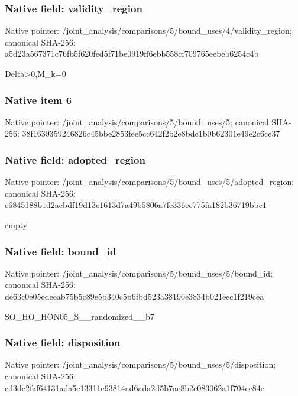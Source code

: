 \documentclass[10pt,a4paper]{article}
\begin{document}
\subsubsection{Native field: validity\_\allowbreak{}region}
Native pointer: /joint\_\allowbreak{}analysis/comparisons/5/bound\_\allowbreak{}uses/4/validity\_\allowbreak{}region; canonical SHA-256: a5d23a567371c76fb5f620fed5f71be0919ff6ebb558cf709765eebeb6254c4b

\begingroup\raggedright\sloppy Delta>0,\allowbreak{}M\_\allowbreak{}k=\allowbreak{}0\par\endgroup

\subsubsection{Native item 6}
Native pointer: /joint\_\allowbreak{}analysis/comparisons/5/bound\_\allowbreak{}uses/5; canonical SHA-256: 38f1630359246826c45bbe2853fee5cc642f2b2e8bdc1b0b62301e49e2c6ce37

\subsubsection{Native field: adopted\_\allowbreak{}region}
Native pointer: /joint\_\allowbreak{}analysis/comparisons/5/bound\_\allowbreak{}uses/5/adopted\_\allowbreak{}region; canonical SHA-256: e6845188b1d2aebdf19d13c1613d7a49b5806a7fe336ec775fa182b36719bbc1

\begingroup\raggedright\sloppy empty\par\endgroup

\subsubsection{Native field: bound\_\allowbreak{}id}
Native pointer: /joint\_\allowbreak{}analysis/comparisons/5/bound\_\allowbreak{}uses/5/bound\_\allowbreak{}id; canonical SHA-256: de63c0e05edeeab75b5c89e5b340c5b6fbd523a38190e3834b021eec1f219cea

\begingroup\raggedright\sloppy SO\_\allowbreak{}HO\_\allowbreak{}HON05\_\allowbreak{}S\_\allowbreak{}\_\allowbreak{}randomized\_\allowbreak{}\_\allowbreak{}b7\par\endgroup

\subsubsection{Native field: disposition}
Native pointer: /joint\_\allowbreak{}analysis/comparisons/5/bound\_\allowbreak{}uses/5/disposition; canonical SHA-256: cd3dc2faf64131ada5c13311e93814ad6ada2d5b7ae8b2c083062a1f704cc84e
\end{document}
